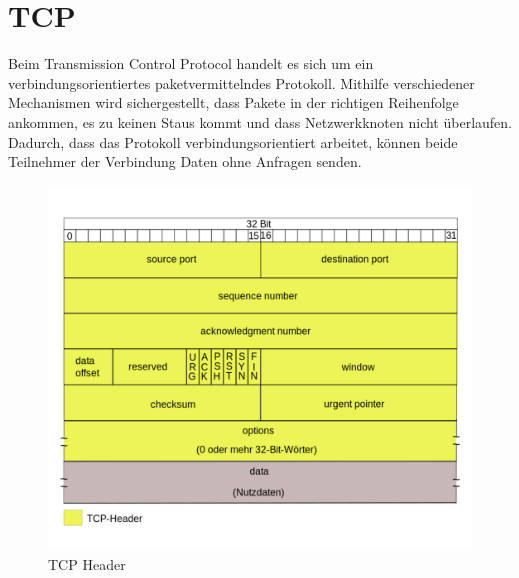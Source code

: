 \section{TCP}

Beim Transmission Control Protocol handelt es sich um ein verbindungsorientiertes paketvermittelndes Protokoll. Mithilfe verschiedener Mechanismen wird sichergestellt, dass Pakete in der richtigen Reihenfolge ankommen, es zu keinen Staus kommt und dass Netzwerkknoten nicht überlaufen. Dadurch, dass das Protokoll verbindungsorientiert arbeitet, können beide Teilnehmer der Verbindung Daten ohne Anfragen senden. 

\begin{figure}
	\includegraphics[width=\textwidth]{images/TCP_header.pdf}
	\caption{TCP Header}
	\label{fig:tcp_header}
\end{figure}

